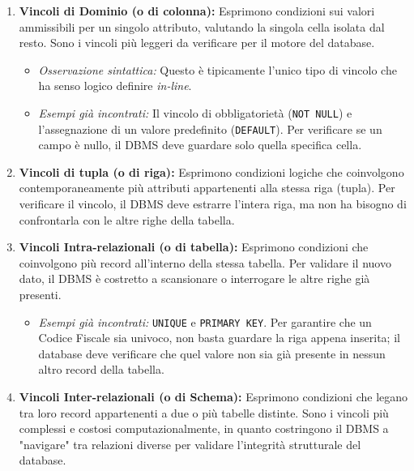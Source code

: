 \begin{enumerate}
    \item \textbf{Vincoli di Dominio (o di colonna):} 
    Esprimono condizioni sui valori ammissibili per un singolo attributo, valutando la singola cella isolata dal resto. Sono i vincoli più leggeri da verificare per il motore del database.
    \begin{itemize}
        \item \textit{Osservazione sintattica:} Questo è tipicamente l'unico tipo di vincolo che ha senso logico definire \textit{in-line}.
        \item \textit{Esempi già incontrati:} Il vincolo di obbligatorietà (\texttt{NOT NULL}) e l'assegnazione di un valore predefinito (\texttt{DEFAULT}). Per verificare se un campo è nullo, il DBMS deve guardare solo quella specifica cella.
    \end{itemize}

    \item \textbf{Vincoli di tupla (o di riga):}
    Esprimono condizioni logiche che coinvolgono contemporaneamente più attributi appartenenti alla stessa riga (tupla). Per verificare il vincolo, il DBMS deve estrarre l'intera riga, ma non ha bisogno di confrontarla con le altre righe della tabella.

    \item \textbf{Vincoli Intra-relazionali (o di tabella):}
    Esprimono condizioni che coinvolgono più record all'interno della stessa tabella. Per validare il nuovo dato, il DBMS è costretto a scansionare o interrogare le altre righe già presenti.
    \begin{itemize}
        \item \textit{Esempi già incontrati:} \texttt{UNIQUE} e \texttt{PRIMARY KEY}. Per garantire che un Codice Fiscale sia univoco, non basta guardare la riga appena inserita; il database deve verificare che quel valore non sia già presente in nessun altro record della tabella.
    \end{itemize}

    \item \textbf{Vincoli Inter-relazionali (o di Schema):}
    Esprimono condizioni che legano tra loro record appartenenti a due o più tabelle distinte. Sono i vincoli più complessi e costosi computazionalmente, in quanto costringono il DBMS a "navigare" tra relazioni diverse per validare l'integrità strutturale del database.
\end{enumerate}

